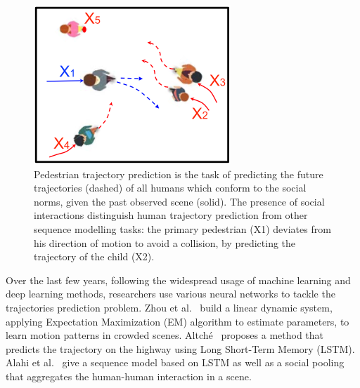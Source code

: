 \begin{figure}[h]
  \centering
  \includegraphics[width=\linewidth]{figures/fig-1.png}
  \caption{Pedestrian trajectory prediction is the task of predicting the future trajectories (dashed) of all humans which conform to the social norms, given the past observed scene (solid). The presence of social interactions distinguish human trajectory prediction from other sequence modelling tasks: the primary pedestrian (X1) deviates from his direction of motion to avoid a collision, by predicting the trajectory of the child (X2). \label{fig:fig-1}\protect\cite[]{HTF:DBLP:journals/corr/abs-2007-03639}}
\end{figure}

Over the last few years, following the widespread usage of machine learning and deep learning methods, researchers use various neural networks to tackle the trajectories prediction problem. Zhou et al.~\cite{Zhou} build a linear dynamic system, applying Expectation Maximization (EM) algorithm to estimate parameters, to learn motion patterns in crowded scenes. Altché~\cite{Altche17} proposes a method that predicts the trajectory on the highway using Long Short-Term Memory (LSTM). Alahi et al.~\cite{Alahi16} give a sequence model based on LSTM as well as a social pooling that aggregates the human-human interaction in a scene.


